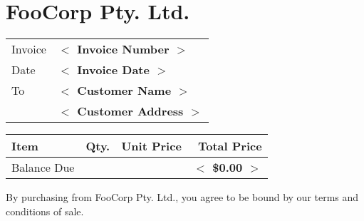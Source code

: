\documentclass{article}
\newcommand{\placeholder}[1]{\textbf{$<$ #1 $>$}}
\newcommand{\invoiceNumber}{\placeholder{Invoice Number}}
\newcommand{\invoiceDate}{\placeholder{Invoice Date}}
\newcommand{\invoiceBalance}{\placeholder{\$0.00}}
\newcommand{\customerName}{\placeholder{Customer Name}}
\newcommand{\customerAddress}{\placeholder{Customer Address}}
\begin{document}
	\section*{FooCorp Pty. Ltd.}

	\begin{tabular}{l l}
		Invoice	& \invoiceNumber{} \\
		Date	& \invoiceDate{} \\
		To		& \customerName{} \\
				& \customerAddress{} \\
	\end{tabular}

	\vspace{15mm}
	\begin{tabularx}{\textwidth}{X r r | r}
	\textbf{Item} & \textbf{Qty.} & \textbf{Unit Price} & \textbf{Total Price}\\
	\hline
	\hline
	Balance Due & & & \invoiceBalance{} \\
	\end{tabularx}
	
	\vfill
	By purchasing from FooCorp Pty. Ltd., you agree to be bound by our terms
	and conditions of sale.
\end{document}
